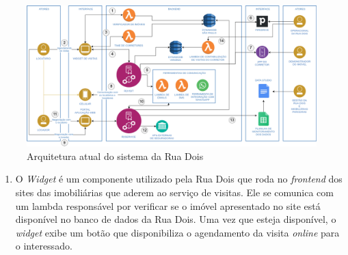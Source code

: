 \begin{figure}[h]
  \centering
  \includegraphics[keepaspectratio=true,scale=0.38]{figuras/r2ArquiteturaAtual.eps}
  \caption{Arquitetura atual do sistema da Rua Dois}
  \label{fig:ArquiteturaAtual}
\end{figure}

  \begin{enumerate}
    \item O \textit{Widget} é um componente utilizado pela Rua Dois que roda no
      \textit{frontend} dos sites das imobiliárias que aderem ao serviço
      de visitas. Ele se comunica com um lambda responsável por verificar se o
      imóvel apresentado no site está disponível no banco de dados da Rua Dois.
      Uma vez que esteja disponível, o \textit{widget} exibe um botão que
      disponibiliza o agendamento da visita \textit{online} para o interessado.
  \end{enumerate}


